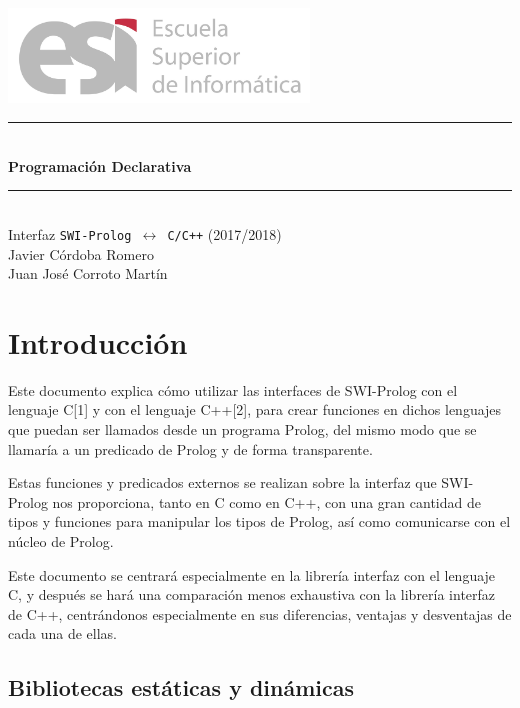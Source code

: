 \documentclass[a4paper,12pt]{article}
\begin{document}
\renewcommand{\contentsname}{Índice}

\begin{titlepage}
\begin{center}

\includegraphics[width=0.6\textwidth]{logoesi}\\[5cm]

\rule{\linewidth}{0.5mm} \\[0.4cm]
{ \huge \bfseries Programación Declarativa\\[0.4cm] }
\rule{\linewidth}{0.5mm} \\[1.5cm]
{\huge Interfaz \texttt{SWI-Prolog $\longleftrightarrow$ C/C++} (2017/2018)}\\[0.5cm]

\large{Javier Córdoba Romero}\\
\large{Juan José Corroto Martín}\\

\end{center}
\end{titlepage}

\tableofcontents
\clearpage

\section{Introducción}

Este documento explica cómo utilizar las interfaces de SWI-Prolog con el lenguaje C[1] y con el lenguaje C++[2], para crear funciones en dichos lenguajes que puedan ser llamados desde un programa Prolog, del mismo modo que se llamaría a un predicado de Prolog y de forma transparente.

Estas funciones y predicados externos se realizan sobre la interfaz que SWI-Prolog nos proporciona, tanto en C como en C++, con una gran cantidad de tipos y funciones para manipular los tipos de Prolog, así como comunicarse con el núcleo de Prolog.

Este documento se centrará especialmente en la librería interfaz con el lenguaje C, y después se hará una comparación menos exhaustiva con la librería interfaz de C++, centrándonos especialmente en sus diferencias, ventajas y desventajas de cada una de ellas.
\subsection{Bibliotecas estáticas y dinámicas}
\end{document}
